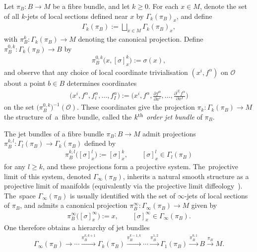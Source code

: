 \documentclass[10pt,a4paper]{amsart}
\numberwithin{equation}{section}
\def\OO{{\mathcal{O}}}
\begin{document}
\begin{Definition}
Let $\pi_{B}\colon B\rightarrow M$ be a fibre bundle, and let $k\geq 0$. For each $x\in M$, denote the set of all $k$-jets of local sections defined near $x$ by $\Gamma_{k}(\pi_{B})_{x}$, and define
\begin{gather*}
\Gamma_{k}(\pi_{B}):=\bigsqcup_{x\in M}\Gamma_{k}(\pi_{B})_{x},
\end{gather*}
with $\pi_{B}^{k}\colon \Gamma_{k}(\pi_{B})\rightarrow M$ denoting the canonical projection. Define $\pi_{B}^{0,k}\colon \Gamma_{k}(\pi_{B})\rightarrow B$ by
\begin{gather*}
\pi_{B}^{0,k}\big(x,[\sigma]^{k}_{x}\big):=\sigma(x),
\end{gather*}
and observe that any choice of local coordinate trivialisation $(x^{i},f^{\alpha})$ on $\OO$ about a point $b\in B$ determines coordinates
\begin{gather*}%
\big(x^{i},f^{\alpha},f^{\alpha}_{i},\dots,f^{\alpha}_{I}\big):=\bigg(x^{i},f^{\alpha},\frac{\partial f^{\alpha}}{\partial x^{i}},\dots,\frac{\partial^{|I|}f^{\alpha}}{\partial x^{I}}\bigg)
\end{gather*}
on the set $\big(\pi^{0,k}_{B}\big)^{-1}(\OO)$. These coordinates give the projection $\pi_{k}\colon \Gamma_{k}(\pi_{B})\rightarrow M$ the structure of~a~fibre bundle, called the $k^{\rm th}$ \textit{order jet bundle} of $\pi_{B}$.
\end{Definition}

The jet bundles of a fibre bundle $\pi_{B}\colon B\rightarrow M$ admit projections $\pi_{B}^{k,l}\colon \Gamma_{l}(\pi_{B})\rightarrow \Gamma_{k}(\pi_{B})$ defined by
\begin{gather*}
\pi_{B}^{k,l}\big([\sigma]^{l}_{x}\big):=[\sigma]^{k}_{x},\qquad [\sigma]^{l}_{x}\in \Gamma_{l}(\pi_{B})
\end{gather*}
for any $l\geq k$, and these projections form a projective system. The~projective limit of this system, denoted $\Gamma_{\infty}(\pi_{B})$, inherits a natural smooth structure as a projective limit of manifolds \cite[Chapter One, Section A]{varbi} (equivalently via the projective limit diffeology~\cite[Section 1.39]{diffeology}). The~space $\Gamma_{\infty}(\pi_{B})$ is usually identified with the set of $\infty$-jets of local sections of $\pi_{B}$, and admits a canonical projection $\pi_{B}^{\infty}\colon \Gamma_{\infty}(\pi_{B})\rightarrow M$ given by
\begin{gather*}
\pi_{B}^{\infty}\big([\sigma]^{\infty}_{x}\big):=x,\qquad [\sigma]^{\infty}_{x}\in \Gamma_{\infty}(\pi_{B}).
\end{gather*}
One therefore obtains a hierarchy of jet bundles
\begin{gather*}
\Gamma_{\infty}(\pi_{B})\rightarrow\cdots\xrightarrow{\pi_{B}^{k,k+1}} \Gamma_{k}(\pi_{B})\xrightarrow{\pi_{B}^{k-1,k}}\cdots\xrightarrow{\pi_{B}^{1,2}} \Gamma_{1}(\pi_{B})\xrightarrow{\pi_{B}^{0,1}}B\xrightarrow{\pi_{B}}M.
\end{gather*}
\end{document}
